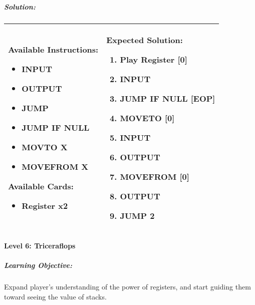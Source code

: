 \subparagraph{Solution:} 
\begin{center}
    \begin{tabular}{ | m{5cm} | m{9cm} | } 
        \hline
            \textbf{Available Instructions:} 
            \begin{itemize}
                \setlength\itemsep{-.35em}
                \item INPUT
                \item OUTPUT
                \item JUMP
                \item JUMP IF NULL
                \item MOVTO X
                \item MOVEFROM X
            \end{itemize}
            \textbf{Available Cards:} 
            \begin{itemize}
                \setlength\itemsep{-.35em}
                \item Register x2
            \end{itemize}& 
            \textbf{Expected Solution:} 
            \begin{enumerate}
                \setlength\itemsep{-.35em}
                \item Play Register [0]
                \item INPUT
                \item JUMP IF NULL [EOP]
                \item MOVETO [0]
                \item INPUT
                \item OUTPUT
                \item MOVEFROM [0] 
                \item OUTPUT
                \item JUMP 2
            \end{enumerate}
            \\
        \hline
    \end{tabular}
\end{center}
\newpage

\paragraph{Level 6: Triceraflops}
\subparagraph{Learning Objective:} Expand player's understanding of the power of registers, and start guiding them toward seeing the value of stacks.

